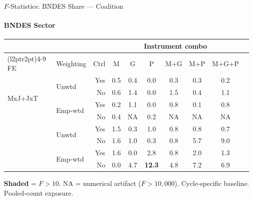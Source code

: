 \documentclass[aspectratio=169,10pt]{beamer}
\newcommand{\fpass}[1]{\cellcolor{pass}\textbf{#1}}
\begin{document}
\begin{frame}[t]{$F$-Statistics: BNDES Share --- Coalition}
\framesubtitle{BNDES Sector}
\begin{center}
\footnotesize
\setlength{\tabcolsep}{3.5pt}
\renewcommand{\arraystretch}{1.05}
\begin{tabular}{@{}llrccccccc@{}}
\toprule
 & & & \multicolumn{6}{c}{Instrument combo} \\
\cmidrule(l{2pt}r{2pt}){4-9}
FE & Weighting & Ctrl & M & G & P & M+G & M+P & M+G+P \\
\midrule
  \multirow{4}{*}{MxJ+JxT} & \multirow{2}{*}{Unwtd} & Yes & 0.5 & 0.4 & 0.0 & 0.3 & 0.3 & 0.2 \\
   &  & No & 0.6 & 1.4 & 0.0 & 1.5 & 0.4 & 1.1 \\
   & \multirow{2}{*}{Emp-wtd} & Yes & 0.2 & 1.1 & 0.0 & 0.8 & 0.1 & 0.8 \\
   &  & No & 0.4 & NA & 0.2 & NA & NA & NA \\
\addlinespace[5pt]
  \multirow{4}{*}{MxJ+MxT} & \multirow{2}{*}{Unwtd} & Yes & 1.5 & 0.3 & 1.0 & 0.8 & 0.8 & 0.7 \\
   &  & No & 1.6 & 1.0 & 0.3 & 0.8 & 5.7 & 9.0 \\
   & \multirow{2}{*}{Emp-wtd} & Yes & 1.6 & 0.0 & 2.8 & 0.8 & 2.0 & 1.3 \\
   &  & No & 0.0 & 4.7 & \fpass{12.3} & 4.8 & 7.2 & 6.9 \\
\bottomrule
\end{tabular}
\end{center}
{\scriptsize \colorbox{pass}{\textbf{Shaded}} = $F>10$. NA = numerical artifact ($F>10{,}000$). Cycle-specific baseline. Pooled-count exposure.}
\end{frame}
\end{document}
